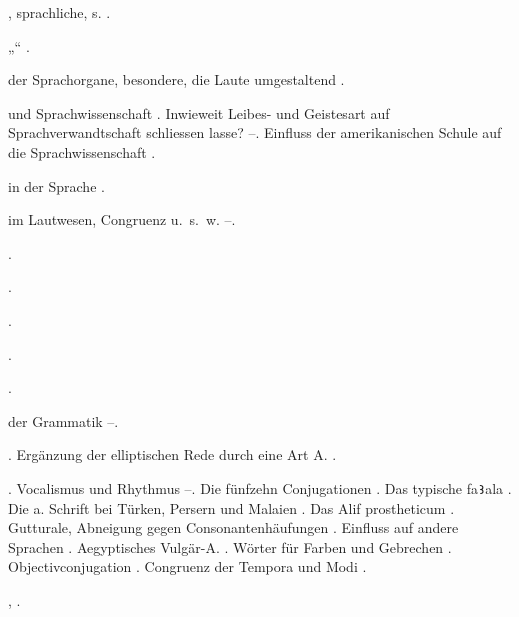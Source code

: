 \begin{register}
, sprachliche, s. .

„“ \pageref{sp.232}.

 der Sprachorgane, besondere, die Laute umgestaltend \pageref{sp.183}.

 und Sprachwissenschaft \pageref{sp.13}. Inwieweit Leibes- und Geistesart auf Sprachverwandtschaft schliessen lasse? \pageref{sp.147}–\pageref{sp.148}. Einfluss der amerikanischen Schule auf die Sprachwissenschaft \pageref{sp.159}.

 in der Sprache \pageref{sp.2}.


 im Lautwesen, Congruenz u.~s.~w. \pageref{sp.401}–\pageref{sp.403}.

.

 \pageref{sp.119}.



 \pageref{sp.201}.


 \pageref{sp.201}.

 \pageref{sp.21}.

 der Grammatik \pageref{sp.106}–\pageref{sp.107}.

 \pageref{sp.101}. Ergänzung der elliptischen Rede durch eine Art A. \pageref{sp.375}.

. Vocalismus und Rhythmus \pageref{sp.92}–\pageref{sp.93}. Die fünfzehn Conjugationen \pageref{sp.116}. Das typische fa\texttt{Ꜣ}ala \pageref{sp.117}. Die a. Schrift bei Türken, Persern und Malaien \pageref{sp.129}. Das Alif prostheticum \pageref{sp.157}. Gutturale, Abneigung gegen Consonantenhäufungen \pageref{sp.197}.  Einfluss auf andere Sprachen \pageref{sp.271}. Aegyptisches Vulgär-A. \pageref{sp.276}.  Wörter für Farben und Gebrechen \pageref{sp.441}. Objectivconjugation \pageref{sp.460}. Congruenz der Tempora und Modi \pageref{sp.466}.

 \pageref{sp.149}, \pageref{sp.257}.


\end{register}
